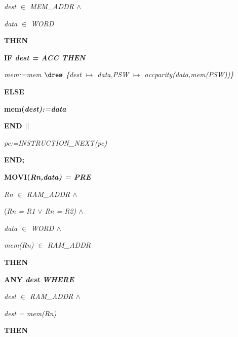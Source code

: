 \begin{sloppypar}
\hspace*{0.20in}\it dest $\in$  \it MEM\_ADDR  $\land$ 

\hspace*{0.20in}\it data $\in$  \it WORD

\hspace*{0.10in}\bf THEN

\hspace*{0.20in}\bf IF \it dest \rm = \it ACC \bf THEN

\hspace*{0.30in}\it mem\rm :=\it mem $\lover$ \rm \{\it dest $\mapsto$ \it data\rm ,\it PSW $\mapsto$ \it accparity\rm (\it data\rm ,\it mem\rm (\it PSW\rm )\rm )\rm \}

\hspace*{0.20in}\bf ELSE

\hspace*{0.30in}\bf mem\rm (\it dest\rm )\rm :=\it data

\hspace*{0.20in}\bf END  $\mbox{$\mid\mid$}$ 

\hspace*{0.20in}\it pc\rm :=\it INSTRUCTION\_NEXT\rm (\it pc\rm )

\hspace*{0.10in}\bf END\rm ;

\hspace*{0.10in}\bf MOVI\rm (\it Rn\rm ,\it data\rm ) \rm = \bf PRE

\hspace*{0.20in}\it Rn $\in$  \it RAM\_ADDR  $\land$ 

\hspace*{0.20in}\rm (\it Rn \rm = \it R1  $\lor$  \it Rn \rm = \it R2\rm )  $\land$ 

\hspace*{0.20in}\it data $\in$  \it WORD  $\land$ 

\hspace*{0.20in}\it mem\rm (\it Rn\rm ) $\in$  \it RAM\_ADDR

\hspace*{0.10in}\bf THEN

\hspace*{0.20in}\bf ANY \it dest \bf WHERE

\hspace*{0.30in}\it dest $\in$  \it RAM\_ADDR  $\land$ 

\hspace*{0.30in}\it dest \rm = \it mem\rm (\it Rn\rm )

\hspace*{0.20in}\bf THEN


\end{sloppypar}
